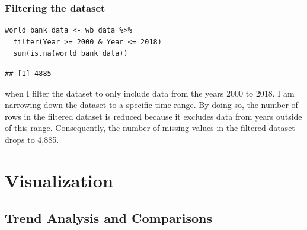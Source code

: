 \documentclass{article}\usepackage[]{graphicx}\usepackage[]{xcolor}
\makeatletter
\newenvironment{kframe}{%
 \def\at@end@of@kframe{}%
 \ifinner\ifhmode%
  \def\at@end@of@kframe{\end{minipage}}%
  \begin{minipage}{\columnwidth}%
 \fi\fi%
 \def\FrameCommand##1{\hskip\@totalleftmargin \hskip-\fboxsep
 \colorbox{shadecolor}{##1}\hskip-\fboxsep
     \hskip-\linewidth \hskip-\@totalleftmargin \hskip\columnwidth}%
 \MakeFramed {\advance\hsize-\width
   \@totalleftmargin\z@ \linewidth\hsize
   \@setminipage}}%
 {\par\unskip\endMakeFramed%
 \at@end@of@kframe}
\newenvironment{knitrout}{}{} %
\makeatother
\begin{document}
\subsubsection{Filtering the dataset}
\begin{lstlisting}
world_bank_data <- wb_data %>% 
  filter(Year >= 2000 & Year <= 2018)
  sum(is.na(world_bank_data))
\end{lstlisting}
\begin{knitrout}
\color{fgcolor}\begin{kframe}
\begin{verbatim}
## [1] 4885
\end{verbatim}
\end{kframe}
\end{knitrout}
when I filter the dataset to only include data from the years 2000 to 2018. I am narrowing down the dataset to a specific time range. By doing so, the number of rows in the filtered dataset is reduced because it excludes data from years outside of this range. Consequently, the number of missing values in the filtered dataset drops to 4,885.

\section{Visualization}
\subsection{Trend Analysis and Comparisons}
\end{document}
